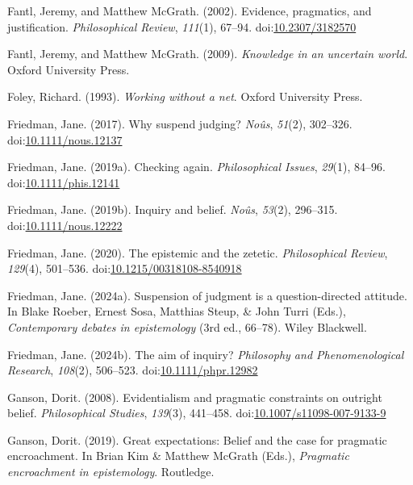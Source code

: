 \documentclass[
  10pt,
  letterpaper,
  twoside]{scrbook}
\newlength{\cslhangindent}
\newenvironment{CSLReferences}[2] %
 {\begin{list}{}{%
  \setlength{\itemindent}{0pt}
  \setlength{\leftmargin}{0pt}
  \setlength{\parsep}{0pt}
  \ifodd #1
   \setlength{\leftmargin}{\cslhangindent}
   \setlength{\itemindent}{-1\cslhangindent}
  \fi
  \setlength{\itemsep}{#2\baselineskip}}}
 {\end{list}}
\begin{document}
\begin{CSLReferences}{1}{0}
Fantl, Jeremy, and Matthew McGrath. (2002). Evidence, pragmatics, and
justification. \emph{Philosophical Review}, \emph{111}(1), 67--94.
doi:\href{https://doi.org/10.2307/3182570}{10.2307/3182570}

Fantl, Jeremy, and Matthew McGrath. (2009). \emph{Knowledge in an
uncertain world}. Oxford University Press.

Foley, Richard. (1993). \emph{Working without a net}. Oxford University
Press.

Friedman, Jane. (2017). Why suspend judging? \emph{No{û}s},
\emph{51}(2), 302--326.
doi:\href{https://doi.org/10.1111/nous.12137}{10.1111/nous.12137}

Friedman, Jane. (2019a). Checking again. \emph{Philosophical Issues},
\emph{29}(1), 84--96.
doi:\href{https://doi.org/10.1111/phis.12141}{10.1111/phis.12141}

Friedman, Jane. (2019b). Inquiry and belief. \emph{No{û}s},
\emph{53}(2), 296--315.
doi:\href{https://doi.org/10.1111/nous.12222}{10.1111/nous.12222}

Friedman, Jane. (2020). The epistemic and the zetetic.
\emph{Philosophical Review}, \emph{129}(4), 501--536.
doi:\href{https://doi.org/10.1215/00318108-8540918}{10.1215/00318108-8540918}

Friedman, Jane. (2024a). Suspension of judgment is a question-directed
attitude. In Blake Roeber, Ernest Sosa, Matthias Steup, \& John Turri
(Eds.), \emph{Contemporary debates in epistemology} (3rd ed., 66--78).
Wiley Blackwell.

Friedman, Jane. (2024b). The aim of inquiry? \emph{{P}hilosophy and
{P}henomenological {R}esearch}, \emph{108}(2), 506--523.
doi:\href{https://doi.org/10.1111/phpr.12982}{10.1111/phpr.12982}

Ganson, Dorit. (2008). Evidentialism and pragmatic constraints on
outright belief. \emph{Philosophical Studies}, \emph{139}(3), 441--458.
doi:\href{https://doi.org/10.1007/s11098-007-9133-9}{10.1007/s11098-007-9133-9}

Ganson, Dorit. (2019). Great expectations: Belief and the case for
pragmatic encroachment. In Brian Kim \& Matthew McGrath (Eds.),
\emph{Pragmatic encroachment in epistemology}. Routledge.


\end{CSLReferences}
\end{document}
